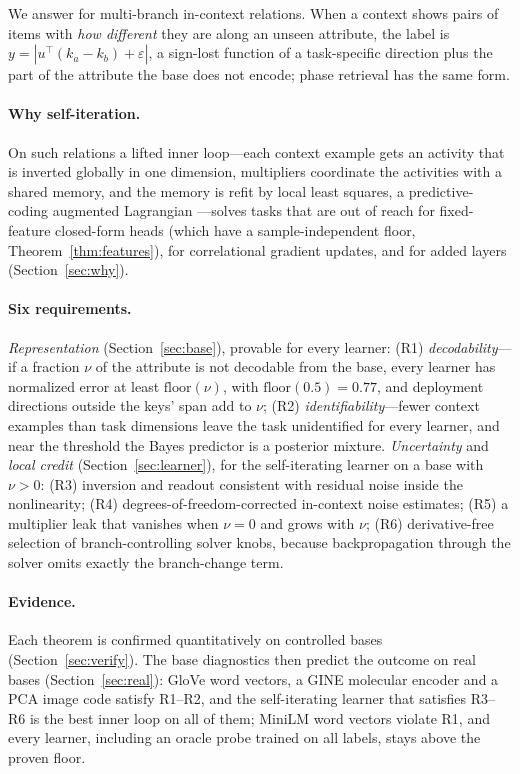 \documentclass{article}
\theoremstyle{definition}
\theoremstyle{remark}
\newcommand{\flr}{\mathrm{floor}}
\begin{document}
We answer for multi-branch in-context relations.
When a context shows pairs of items with \emph{how different} they are along an unseen attribute, the label is $y=|u^\top(k_a-k_b)+\varepsilon|$, a sign-lost function of a task-specific direction plus the part of the attribute the base does not encode; phase retrieval has the same form.

\paragraph{Why self-iteration.}
On such relations a lifted inner loop---each context example gets an activity that is inverted globally in one dimension, multipliers coordinate the activities with a shared memory, and the memory is refit by local least squares, a predictive-coding augmented Lagrangian \citep{seely2026pcalm}---solves tasks that are out of reach for fixed-feature closed-form heads (which have a sample-independent floor, Theorem~\ref{thm:features}), for correlational gradient updates, and for added layers (Section~\ref{sec:why}).

\paragraph{Six requirements.}
\emph{Representation} (Section~\ref{sec:base}), provable for every learner:
(R1) \emph{decodability}---if a fraction $\nu$ of the attribute is not decodable from the base, every learner has normalized error at least $\flr(\nu)$, with $\flr(0.5)=0.77$, and deployment directions outside the keys' span add to $\nu$;
(R2) \emph{identifiability}---fewer context examples than task dimensions leave the task unidentified for every learner, and near the threshold the Bayes predictor is a posterior mixture.
\emph{Uncertainty} and \emph{local credit} (Section~\ref{sec:learner}), for the self-iterating learner on a base with $\nu>0$:
(R3) inversion and readout consistent with residual noise inside the nonlinearity;
(R4) degrees-of-freedom-corrected in-context noise estimates;
(R5) a multiplier leak that vanishes when $\nu=0$ and grows with $\nu$;
(R6) derivative-free selection of branch-controlling solver knobs, because backpropagation through the solver omits exactly the branch-change term.

\paragraph{Evidence.}
Each theorem is confirmed quantitatively on controlled bases (Section~\ref{sec:verify}).
The base diagnostics then predict the outcome on real bases (Section~\ref{sec:real}): GloVe word vectors, a GINE molecular encoder and a PCA image code satisfy R1--R2, and the self-iterating learner that satisfies R3--R6 is the best inner loop on all of them; MiniLM word vectors violate R1, and every learner, including an oracle probe trained on all labels, stays above the proven floor.
\end{document}
